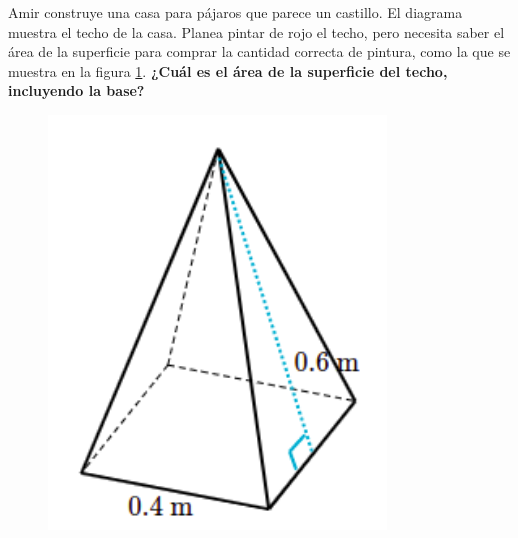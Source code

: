 \question[10] Amir construye una casa para pájaros que parece un castillo. El diagrama muestra el techo de la casa.
Planea pintar de rojo el techo, pero necesita saber el área de la superficie para comprar la cantidad correcta de pintura,
como la que se muestra en la figura \ref{fig:prob_verb_superficie_06}.
\textbf{¿Cuál es el área de la superficie del techo, incluyendo la base?}

\begin{minipage}{0.3\linewidth}
    \begin{figure}[H]
        \begin{center}
            \includegraphics[width=0.8\textwidth]{../images/prob_verb_superficie_06}
        \end{center}
        \caption{}
        \label{fig:prob_verb_superficie_06}
    \end{figure}
\end{minipage}
\begin{minipage}{0.7\linewidth}
\end{minipage}